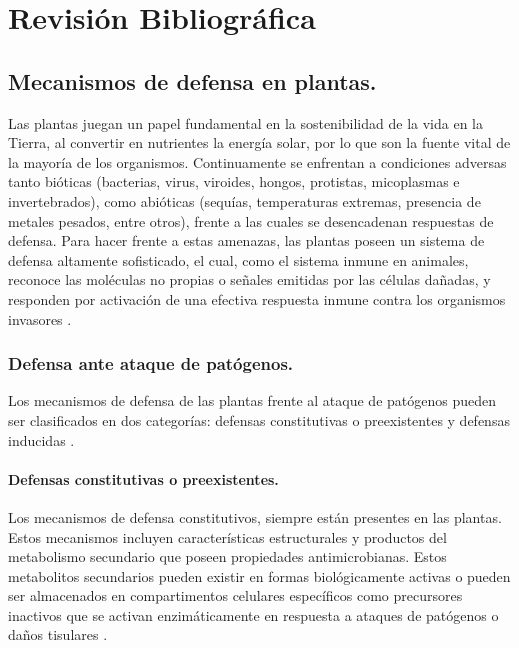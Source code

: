 
\chapter{Revisión Bibliográfica}

\section{Mecanismos de defensa en plantas.}

Las plantas juegan un papel fundamental en la sostenibilidad de la vida en la Tierra, al convertir en nutrientes la energía solar, por lo que son la fuente vital de la mayoría de los organismos. Continuamente se enfrentan a condiciones adversas tanto bióticas (bacterias, virus, viroides, hongos, protistas, micoplasmas e invertebrados), como abióticas (sequías, temperaturas extremas, presencia de metales pesados, entre otros), frente a las cuales se desencadenan respuestas de defensa. Para hacer frente a estas amenazas, las plantas poseen un sistema de defensa altamente sofisticado, el cual, como el sistema inmune en animales, reconoce las moléculas no propias o señales emitidas por las células dañadas, y responden por activación de una efectiva respuesta inmune contra los organismos invasores \citep{jones2006plant, howe2008plant}.

\subsection {Defensa ante ataque de pat\'ogenos.}

Los mecanismos de defensa de las plantas frente al ataque de pat\'ogenos pueden ser clasificados en dos categor\'ias: defensas constitutivas o preexistentes y defensas inducidas \citep{mithofer2012plant}.

\subsubsection{Defensas constitutivas o preexistentes.}

Los mecanismos de defensa constitutivos, siempre est\'an presentes en las plantas. Estos mecanismos incluyen características estructurales y productos del metabolismo secundario que poseen propiedades antimicrobianas. Estos metabolitos secundarios pueden existir en formas biológicamente activas o pueden ser almacenados en compartimentos celulares espec\'ificos como precursores inactivos que se activan enzimáticamente en respuesta a ataques de patógenos o daños tisulares \citep{mithofer2016general}.
		
